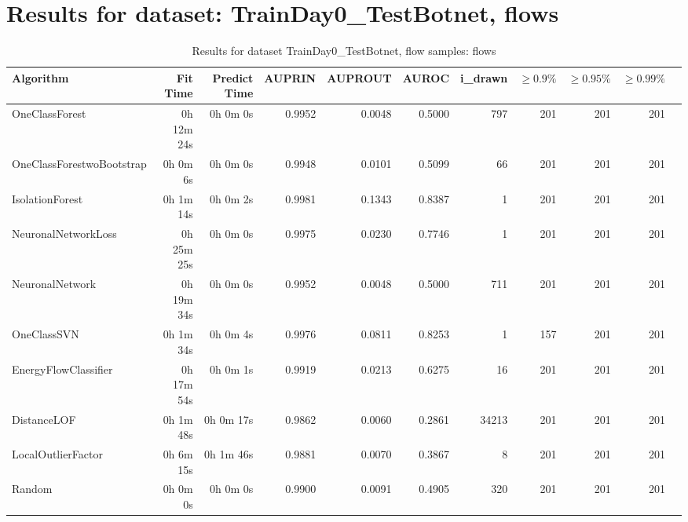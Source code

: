 \documentclass{article}
\begin{document}
\section*{Results for dataset: TrainDay0_TestBotnet, flows}
\begin{table}[h!]
\centering
\caption{Results for dataset TrainDay0_TestBotnet, flow samples: flows}
\begin{tabular}{lrrrrrrrrrr}
\toprule
Algorithm & Fit Time & Predict Time & AUPRIN & AUPROUT & AUROC & i\_drawn & $\geq 0.9\%$ & $\geq 0.95\%$ & $\geq 0.99\%$ \\
\midrule
OneClassForest & 0h 12m 24s & 0h 0m 0s & 0.9952 & 0.0048 & 0.5000 & 797 & 201 & 201 & 201 \\
OneClassForestwoBootstrap & 0h 0m 6s & 0h 0m 0s & 0.9948 & 0.0101 & 0.5099 & 66 & 201 & 201 & 201 \\
IsolationForest & 0h 1m 14s & 0h 0m 2s & 0.9981 & 0.1343 & 0.8387 & 1 & 201 & 201 & 201 \\
NeuronalNetworkLoss & 0h 25m 25s & 0h 0m 0s & 0.9975 & 0.0230 & 0.7746 & 1 & 201 & 201 & 201 \\
NeuronalNetwork & 0h 19m 34s & 0h 0m 0s & 0.9952 & 0.0048 & 0.5000 & 711 & 201 & 201 & 201 \\
OneClassSVN & 0h 1m 34s & 0h 0m 4s & 0.9976 & 0.0811 & 0.8253 & 1 & 157 & 201 & 201 \\
EnergyFlowClassifier & 0h 17m 54s & 0h 0m 1s & 0.9919 & 0.0213 & 0.6275 & 16 & 201 & 201 & 201 \\
DistanceLOF & 0h 1m 48s & 0h 0m 17s & 0.9862 & 0.0060 & 0.2861 & 34213 & 201 & 201 & 201 \\
LocalOutlierFactor & 0h 6m 15s & 0h 1m 46s & 0.9881 & 0.0070 & 0.3867 & 8 & 201 & 201 & 201 \\
Random & 0h 0m 0s & 0h 0m 0s & 0.9900 & 0.0091 & 0.4905 & 320 & 201 & 201 & 201 \\
\bottomrule
\end{tabular}
\end{table}
\end{document}
